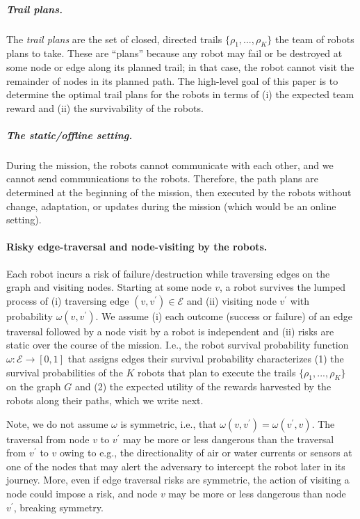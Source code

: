 \documentclass[11pt, oneside]{article}
\begin{document}
\subparagraph{Trail plans.} The \emph{trail plans} are the set of closed, directed trails $\{\rho_1, ..., \rho_K\}$ the team of robots plans to take. These are ``plans'' because any robot may fail or be destroyed at some node or edge along its planned trail; in that case, the robot cannot visit the remainder of nodes in its planned path.
The high-level goal of this paper is to determine the optimal trail plans for the robots in terms of (i) the expected team reward and (ii) the survivability of the robots. 

\subparagraph{The static/offline setting.} During the mission, the robots cannot communicate with each other, and we cannot send communications to the robots. Therefore, the path plans are determined at the beginning of the mission, then executed by the robots without change, adaptation, or updates during the mission (which would be an online setting).

\paragraph{Risky edge-traversal and node-visiting by the robots.}
Each robot incurs a risk of failure/destruction while traversing edges on the graph and visiting nodes. 
Starting at some node $v$, a robot survives the lumped process of (i) traversing edge $(v, v^\prime) \in \mathcal{E}$ and (ii) visiting node $v^\prime$ with probability $\omega(v, v^\prime)$. 
We assume (i) each outcome (success or failure) of an edge traversal followed by a node visit by a robot is independent and (ii) risks are static over the course of the mission. 
I.e., the robot survival probability function $\omega: \mathcal{E} \rightarrow [0, 1]$ that assigns edges their survival probability characterizes (1) the survival probabilities of the $K$ robots that plan to execute the trails $\{\rho_1, ..., \rho_K\}$ on the graph $G$ and (2) the expected utility of the rewards harvested by the robots along their paths, which we write next. 

Note, we do not assume $\omega$ is symmetric, i.e., that $\omega(v, v^\prime) = \omega(v^\prime, v)$. The traversal from node $v$ to $v^\prime$ may be more or less dangerous than the traversal from $v^\prime$ to $v$ owing to e.g., the directionality of air or water currents or sensors at one of the nodes that may alert the adversary to intercept the robot later in its journey. More, even if edge traversal risks are symmetric, the action of visiting a node could impose a risk, and node $v$ may be more or less dangerous than node $v^\prime$, breaking symmetry. 
\end{document}
